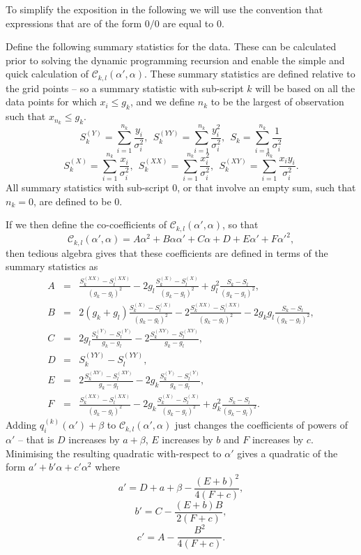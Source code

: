 \documentclass[nojss]{jss}
\begin{document}
To simplify the exposition in the following we will use the convention that expressions that are of the form $0/0$ are equal to 0.

Define the following summary statistics for the data. These can be calculated prior to solving the dynamic programming recursion and enable the simple and quick calculation of $\mathcal{C}_{k,l}(\alpha',\alpha)$. These summary statistics are defined relative to the grid points -- so a summary statistic with sub-script $k$ will be based on all the data points for which $x_i\leq g_k$, and we define $n_k$ to be the largest of observation such that $x_{n_k}\leq g_k$.  
\[
S^{(Y)}_k=\sum_{i=1}^{n_k} \frac{y_i}{\sigma_i^2},~~S^{(YY)}_k=\sum_{i=1}^{n_k} \frac{y^2_i}{\sigma_i^2},~~S^{}_k=\sum_{i=1}^{n_k} \frac{1}{\sigma_i^2}
\]
\[
S^{(X)}_k=\sum_{i=1}^{n_k} \frac{x_i}{\sigma_i^2},~~S^{(XX)}_k=\sum_{i=1}^{n_k} \frac{x^2_i}{\sigma_i^2},~~S^{(XY)}_k=\sum_{i=1}^{n_k} \frac{x_iy_i}{\sigma_i^2}.
\]
All summary statistics with sub-script 0, or that involve an empty sum, such that $n_k=0$, are defined to be 0.

If we then define the co-coefficients of $\mathcal{C}_{k,l}(\alpha',\alpha)$, so that
\[
\mathcal{C}_{k,l}(\alpha',\alpha)=A\alpha^2+B\alpha\alpha'+C\alpha+D+E\alpha'+F\alpha'^2,
\]
then tedious algebra gives that these coefficients are defined in terms of the summary statistics as
\begin{eqnarray*}
A&=&\frac{S^{(XX)}_k-S^{(XX)}_l}{(g_k-g_l)^2}-2g_l\frac{S^{(X)}_k-S^{(X)}_l}{(g_k-g_l)^2}+g_l^2\frac{S_k-S_l}{(g_k-g_l)^2},\\
B&=&2(g_k+g_l)\frac{S^{(X)}_k-S^{(X)}_l}{(g_k-g_l)^2}-2\frac{S^{(XX)}_k-S^{(XX)}_l}{(g_k-g_l)^2}-2g_kg_l\frac{S_k-S_l}{(g_k-g_l)^2},\\
C&=&2g_l\frac{S^{(Y)}_k-S^{(Y)}_l}{g_k-g_l}-2\frac{S^{(XY)}_k-S^{(XY)}_l}{g_k-g_l} ,\\ 
D&=&S^{(YY)}_k-S^{(YY)}_l, \\
E&=& 2\frac{S^{(XY)}_k-S^{(XY)}_l}{g_k-g_l}-2g_k\frac{S^{(Y)}_k-S^{(Y)}_l}{g_k-g_l},\\
F&=&\frac{S^{(XX)}_k-S^{(XX)}_l}{(g_k-g_l)^2}-2g_k\frac{S^{(X)}_k-S^{(X)}_l}{(g_k-g_l)^2}+g_k^2\frac{S_k-S_l}{(g_k-g_l)^2}. 
\end{eqnarray*}
Adding $q_{i}^{(k)}(\alpha')+\beta$ to $\mathcal{C}_{k,l}(\alpha',\alpha)$ just changes the coefficients of powers of $\alpha'$ -- that is $D$ increases by $a+\beta$, $E$ increases by $b$ and $F$ increases by $c$. Minimising the resulting quadratic with-respect to $\alpha'$ gives a quadratic of the form $a'+b'\alpha+c'\alpha^2$ where
\[
a'=D+a+\beta-\frac{(E+b)^2}{4(F+c)},
\]
\[
b'=C-\frac{(E+b)B}{2(F+c)},
\]
\[
c'=A-\frac{B^2}{4(F+c)}.
\]
\end{document}
